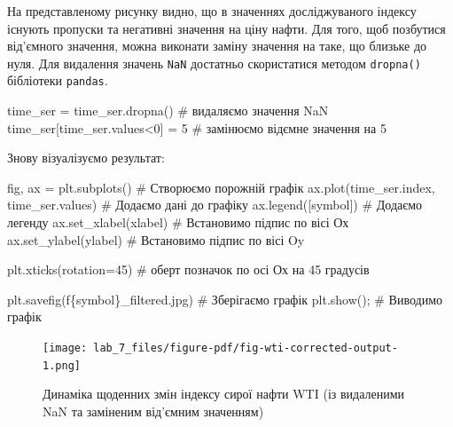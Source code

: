\documentclass[
  letterpaper,
]{report}
\newenvironment{Shaded}{\begin{snugshade}}{\end{snugshade}}
\newcommand{\CommentTok}[1]{\textcolor[rgb]{0.37,0.37,0.37}{#1}}
\newcommand{\DecValTok}[1]{\textcolor[rgb]{0.68,0.00,0.00}{#1}}
\newcommand{\NormalTok}[1]{\textcolor[rgb]{0.00,0.23,0.31}{#1}}
\newcommand{\OperatorTok}[1]{\textcolor[rgb]{0.37,0.37,0.37}{#1}}
\newcommand{\SpecialCharTok}[1]{\textcolor[rgb]{0.37,0.37,0.37}{#1}}
\newcommand{\SpecialStringTok}[1]{\textcolor[rgb]{0.13,0.47,0.30}{#1}}
\begin{document}
На представленому рисунку видно, що в значеннях досліджуваного індексу
існують пропуски та негативні значення на ціну нафти. Для того, щоб
позбутися від'ємного значення, можна виконати заміну значення на таке,
що близьке до нуля. Для видалення значень \texttt{NaN} достатньо
скористатися методом \texttt{dropna()} бібліотеки \texttt{pandas}.

\begin{Shaded}
\begin{Highlighting}[]
\NormalTok{time\_ser }\OperatorTok{=}\NormalTok{ time\_ser.dropna()    }\CommentTok{\# видаляємо значення NaN}
\NormalTok{time\_ser[time\_ser.values}\OperatorTok{\textless{}}\DecValTok{0}\NormalTok{] }\OperatorTok{=} \DecValTok{5} \CommentTok{\# замінюємо від\textquotesingle{}ємне значення на 5}
\end{Highlighting}
\end{Shaded}

Знову візуалізуємо результат:

\begin{Shaded}
\begin{Highlighting}[]
\NormalTok{fig, ax }\OperatorTok{=}\NormalTok{ plt.subplots()                   }\CommentTok{\# Створюємо порожній графік}
\NormalTok{ax.plot(time\_ser.index, time\_ser.values)   }\CommentTok{\# Додаємо дані до графіку}
\NormalTok{ax.legend([symbol])                        }\CommentTok{\# Додаємо легенду}
\NormalTok{ax.set\_xlabel(xlabel)                      }\CommentTok{\# Встановимо підпис по вісі Ох}
\NormalTok{ax.set\_ylabel(ylabel)                      }\CommentTok{\# Встановимо підпис по вісі Oy}

\NormalTok{plt.xticks(rotation}\OperatorTok{=}\DecValTok{45}\NormalTok{)                    }\CommentTok{\# оберт позначок по осі Ох на 45 градусів}

\NormalTok{plt.savefig(}\SpecialStringTok{f\textquotesingle{}}\SpecialCharTok{\{}\NormalTok{symbol}\SpecialCharTok{\}}\SpecialStringTok{\_filtered.jpg\textquotesingle{}}\NormalTok{)      }\CommentTok{\# Зберігаємо графік }
\NormalTok{plt.show()}\OperatorTok{;}                                \CommentTok{\# Виводимо графік}
\end{Highlighting}
\end{Shaded}

\begin{figure}[H]

{\centering \texttt{[image: lab\_7\_files/figure-pdf/fig-wti-corrected-output-1.png]}

}

\caption{\label{fig-wti-corrected}Динаміка щоденних змін індексу сирої
нафти WTI (із видаленими NaN та заміненим від'ємним значенням)}

\end{figure}
\end{document}
